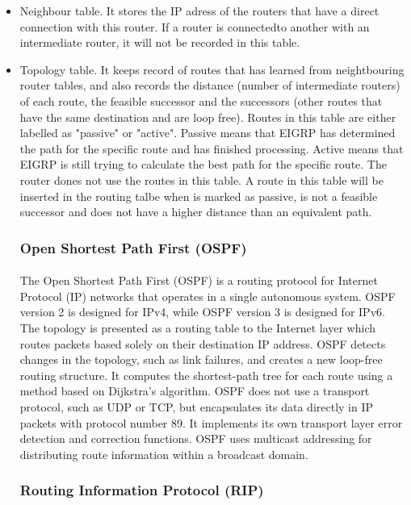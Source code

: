 \begin{itemize}
\item Neighbour table. It stores the IP adress of the routers that have a direct connection with this router. If a router is connectedto another with an intermediate router, it will not be recorded in this table.
\item Topology table. It keeps record of routes that has learned from neightbouring router tables, and also records the distance (number of intermediate routers) of each route, the feasible successor and the successors (other routes that have the same destination and are loop free). Routes in this table are either labelled as "passive" or "active". Passive means that EIGRP  has determined the path for the specific route and has finished processing. Active means that EIGRP is still trying to calculate the best path for the specific route. The router dones not use the routes in this table. A route in this table will be inserted in the routing talbe when is marked as passive, is not a feasible successor and does not have a higher distance than an equivalent path.
\subsubsection*{Open Shortest Path First (OSPF)\cite{OSPFv2}\cite{OSPFIPv6}}
\paragraph{}The Open Shortest Path First (OSPF) is a routing protocol for Internet Protocol (IP) networks that operates in a single autonomous system. OSPF version 2 is designed for IPv4, while OSPF version 3 is designed for IPv6. The topology is presented as a routing table to the Internet layer which routes packets based solely on their destination IP address. OSPF detects changes in the topology, such as link failures, and creates a new loop-free routing structure. It computes the shortest-path tree for each route using a method based on Dijkstra's algorithm. OSPF does not use a transport protocol, such as UDP or TCP, but encapsulates its data directly in IP packets with protocol number 89. It implements its own transport layer error detection and correction functions. OSPF uses multicast addressing for distributing route information within a broadcast domain.

\subsubsection*{Routing Information Protocol (RIP)\cite{RIPv2}\cite{RIPng}}

\end{itemize}
